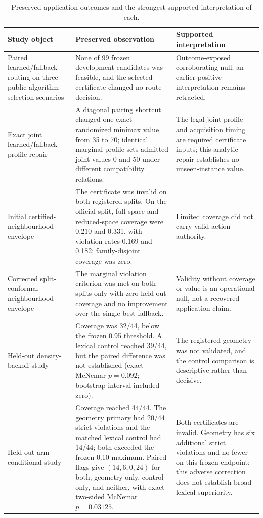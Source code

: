 \documentclass[10pt]{article}
\newcommand{\1}{\mathbf{1}}
\begin{document}
\begin{table}[htbp]
\centering
\small
\setlength{\tabcolsep}{5pt}
\begin{tabular}{P{0.22\textwidth}P{0.38\textwidth}P{0.32\textwidth}}
\toprule
Study object & Preserved observation & Supported interpretation \\
\midrule
Paired learned/fallback routing on three public algorithm-selection scenarios &
None of 99 frozen development candidates was feasible, and the selected certificate changed no route decision. &
Outcome-exposed corroborating null; an earlier positive interpretation remains retracted. \\[2pt]
Exact joint learned/fallback profile repair &
A diagonal pairing shortcut changed one exact randomized minimax value from 35 to 70; identical marginal profile sets admitted joint values 0 and 50 under different compatibility relations. &
The legal joint profile and acquisition timing are required certificate inputs; this analytic repair establishes no unseen-instance value. \\[2pt]
Initial certified-neighbourhood envelope &
The certificate was invalid on both registered splits. On the official split, full-space and reduced-space coverage were 0.210 and 0.331, with violation rates 0.169 and 0.182; family-disjoint coverage was zero. &
Limited coverage did not carry valid action authority. \\[2pt]
Corrected split-conformal neighbourhood envelope &
The marginal violation criterion was met on both splits only with zero held-out coverage and no improvement over the single-best fallback. &
Validity without coverage or value is an operational null, not a recovered application claim. \\[2pt]
Held-out density-backoff study &
Coverage was 32/44, below the frozen 0.95 threshold. A lexical control reached 39/44, but the paired difference was not established (exact McNemar $p=0.092$; bootstrap interval included zero). &
The registered geometry was not validated, and the control comparison is descriptive rather than decisive. \\[2pt]
Held-out arm-conditional study &
Coverage reached 44/44. The geometry primary had 20/44 strict violations and the matched lexical control had 14/44; both exceeded the frozen 0.10 maximum. Paired flags give $(14,6,0,24)$ for both, geometry only, control only, and neither, with exact two-sided McNemar $p=0.03125$. &
Both certificates are invalid. Geometry has six additional strict violations and no fewer on this frozen endpoint; this adverse correction does not establish broad lexical superiority. \\
\bottomrule
\end{tabular}
\caption{Preserved application outcomes and the strongest supported interpretation of each.}
\label{tab:adverse}
\end{table}
\end{document}
